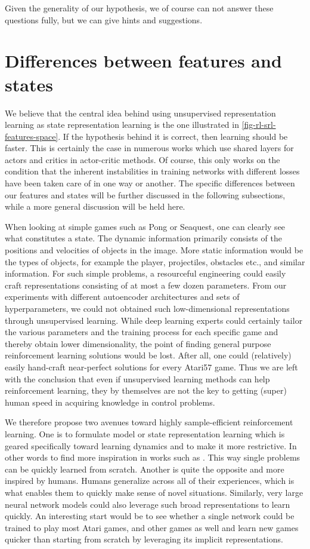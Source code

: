 Given the generality of our hypothesis, we of course can not answer these questions fully,
but we can give hints and suggestions.

\section{Differences between features and states}
We believe that the central idea behind using unsupervised representation learning
as state representation learning is the one illustrated in \ref{fig-rl-srl-features-space}.
If the hypothesis behind it is correct, then learning should be faster.
This is certainly the case in numerous works which use shared layers for actors 
and critics in actor-critic methods.
Of course, this only works on the condition that
the inherent instabilities in training networks with different losses have been taken care of 
in one way or another.
The specific differences between our features and states will be further discussed in
the following subsections, while a more general discussion will be held here.

When looking at simple games such as Pong or Seaquest,
one can clearly see what constitutes a state.
The dynamic information primarily consists of the positions and velocities of objects in the image.
More static information would be the types of objects, for example the player, projectiles, obstacles etc., 
and similar information.
For such simple problems, a resourceful engineering could easily craft representations consisting of at most
a few dozen parameters.
From our experiments with different autoencoder architectures and sets of hyperparameters,
we could not obtained such low-dimensional representations through unsupervised learning.
While deep learning experts could certainly tailor the various parameters and the training process
for each specific game and thereby obtain lower dimensionality, the point of finding
general purpose reinforcement learning solutions would be lost.
After all, one could (relatively) easily hand-craft near-perfect solutions for every
Atari57 game.
Thus we are left with the conclusion that even if unsupervised learning methods 
can help reinforcement learning, they by themselves are not the key to getting (super) human speed in
acquiring knowledge in control problems.

We therefore propose two avenues toward highly sample-efficient reinforcement learning.
One is to formulate model or state representation learning which is geared specifically toward learning dynamics
and to make it more restrictive. In other words to find more inspiration in works such as \cite{pilco}.
This way single problems can be quickly learned from scratch.
Another is quite the opposite and more inspired by humans. 
Humans generalize across all of their experiences, which is what enables them to 
quickly make sense of novel situations.
Similarly, very large neural network models could also leverage such broad
representations to learn quickly. 
An interesting start would be to see whether a single network could be trained to play most Atari games,
and other games as well and learn new games quicker than starting from scratch by leveraging
its implicit representations.

